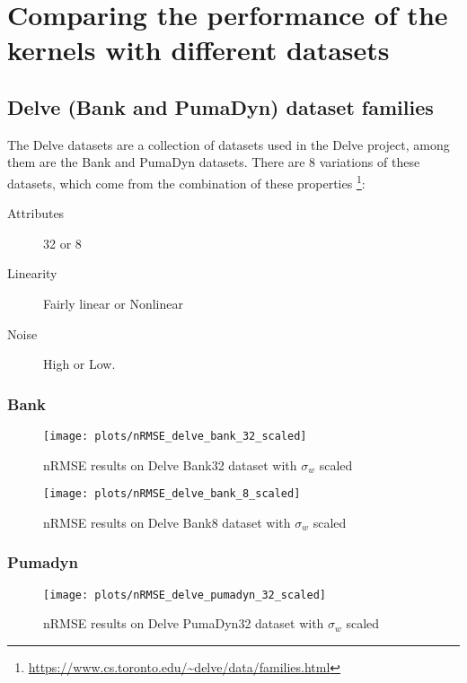 \section{Comparing the performance of the kernels with different datasets}%

\subsection{Delve (Bank and PumaDyn) dataset families}

The Delve datasets are a collection of datasets used in the Delve project,
among them are the Bank and PumaDyn datasets. There are 8 variations of
these datasets, which come from the combination of these properties%
\footnote{\url{https://www.cs.toronto.edu/~delve/data/families.html}}:
\begin{description}
    \item[Attributes] 32 or 8
    \item[Linearity] Fairly linear or Nonlinear
    \item[Noise] High or Low.
\end{description}


\subsubsection{Bank}

\begin{figure}[H]
    \texttt{[image: plots/nRMSE\_delve\_bank\_32\_scaled]}
    \caption{nRMSE results on Delve Bank32 dataset with $\sigma_w$ scaled}
    \label{fig:nrmse-delve-bank-32-scaled}
\end{figure}

\begin{figure}[H]
    \texttt{[image: plots/nRMSE\_delve\_bank\_8\_scaled]}
    \caption{nRMSE results on Delve Bank8 dataset with $\sigma_w$ scaled}
    \label{fig:nrmse-delve-bank-8-scaled}
\end{figure}

\subsubsection{Pumadyn}

\begin{figure}[H]
    \texttt{[image: plots/nRMSE\_delve\_pumadyn\_32\_scaled]}
    \caption{nRMSE results on Delve PumaDyn32 dataset with $\sigma_w$ scaled}
    \label{fig:nrmse-delve-pumadyn-32-scaled}
\end{figure}

